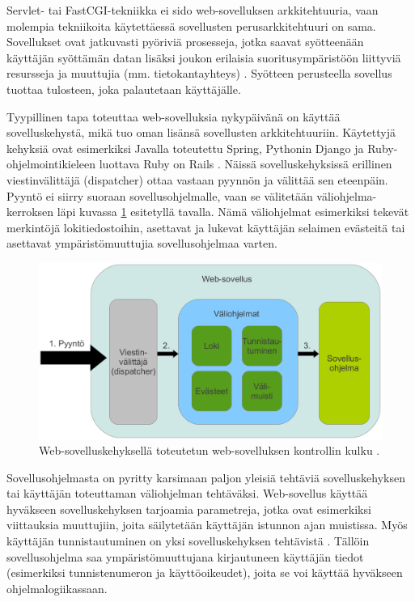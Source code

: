 Servlet- tai FastCGI-tekniikka ei sido web-sovelluksen arkkitehtuuria, vaan molempia tekniikoita käytettäessä sovellusten perusarkkitehtuuri on sama. Sovellukset ovat jatkuvasti pyöriviä prosesseja, jotka saavat syötteenään käyttäjän syöttämän datan lisäksi joukon erilaisia suoritusympäristöön liittyviä resursseja ja muuttujia (mm. tietokantayhteys) \cite{uml}. Syötteen perusteella sovellus tuottaa tulosteen, joka palautetaan käyttäjälle.

Tyypillinen tapa toteuttaa web-sovelluksia nykypäivänä on käyttää sovelluskehystä, mikä tuo oman lisänsä sovellusten arkkitehtuuriin. Käytettyjä kehyksiä ovat esimerkiksi Javalla toteutettu Spring, Pythonin Django ja Ruby-ohjelmointikieleen luottava Ruby on Rails \cite{spring, django, ruby2011agile}. Näissä sovelluskehyksissä erillinen viestinvälittäjä (dispatcher) ottaa vastaan pyynnön ja välittää sen eteenpäin. Pyyntö ei siirry suoraan sovellusohjelmalle, vaan se välitetään väliohjelma-kerroksen läpi kuvassa \ref{dispatcher} esitetyllä tavalla. Nämä väliohjelmat esimerkiksi tekevät merkintöjä lokitiedostoihin, asettavat ja lukevat käyttäjän selaimen evästeitä tai asettavat ympäristömuuttujia sovellusohjelmaa varten.

\begin{figure}[ht]
\centering
\includegraphics[width=\textwidth]{web/dispatcher.eps}
\caption{Web-sovelluskehyksellä toteutetun web-sovelluksen kontrollin kulku \cite{ruby2011agile}.}%
\label{dispatcher}
\end{figure}

Sovellusohjelmasta on pyritty karsimaan paljon yleisiä tehtäviä sovelluskehyksen tai käyttäjän toteuttaman väliohjelman tehtäväksi. Web-sovellus käyttää hyväkseen sovelluskehyksen tarjoamia parametreja, jotka ovat esimerkiksi viittauksia muuttujiin, joita säilytetään käyttäjän istunnon ajan muistissa. Myös käyttäjän tunnistautuminen on yksi sovelluskehyksen tehtävistä \cite{ruby2011agile}. Tällöin sovellusohjelma saa ympäristömuuttujana kirjautuneen käyttäjän tiedot (esimerkiksi tunnistenumeron ja käyttöoikeudet), joita se voi käyttää hyväkseen ohjelmalogiikassaan.